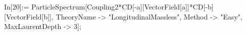 In[20]:= ParticleSpectrum[Coupling2*CD[-a][VectorField[a]]*CD[-b][VectorField[b]], TheoryName -> "LongitudinalMassless", Method -> "Easy", MaxLaurentDepth -> 3]; 